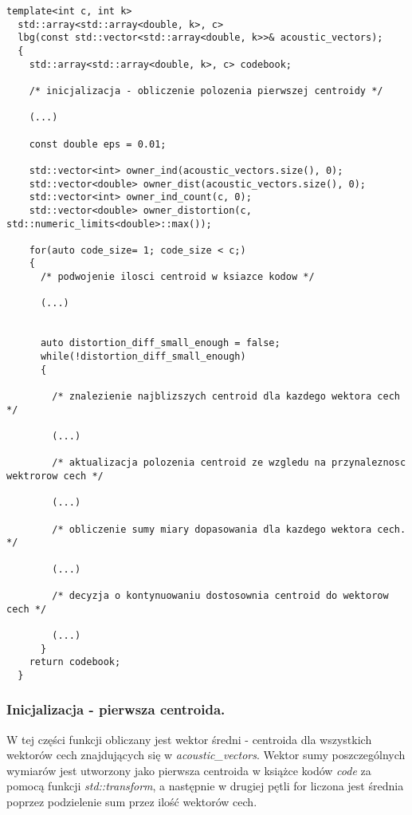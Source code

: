\begin{lstlisting}[style=lst:cpp, caption=Ciało funkcji \textit{lbg}\label{lst:lbgbody1}]
  template<int c, int k>
  std::array<std::array<double, k>, c>
  lbg(const std::vector<std::array<double, k>>& acoustic_vectors);
  {
    std::array<std::array<double, k>, c> codebook;

    /* inicjalizacja - obliczenie polozenia pierwszej centroidy */ 

    (...)

    const double eps = 0.01; 

    std::vector<int> owner_ind(acoustic_vectors.size(), 0);
    std::vector<double> owner_dist(acoustic_vectors.size(), 0);
    std::vector<int> owner_ind_count(c, 0);
    std::vector<double> owner_distortion(c, std::numeric_limits<double>::max());

    for(auto code_size= 1; code_size < c;)
    {
      /* podwojenie ilosci centroid w ksiazce kodow */

      (...)


      auto distortion_diff_small_enough = false;
      while(!distortion_diff_small_enough)
      {

        /* znalezienie najblizszych centroid dla kazdego wektora cech */

        (...)

        /* aktualizacja polozenia centroid ze wzgledu na przynaleznosc wektrorow cech */

        (...)

        /* obliczenie sumy miary dopasowania dla kazdego wektora cech. */

        (...)

        /* decyzja o kontynuowaniu dostosownia centroid do wektorow cech */

        (...)
      }
    return codebook;
  }
\end{lstlisting}

\subsubsection{Inicjalizacja - pierwsza centroida.}

W tej części funkcji obliczany jest wektor średni - centroida dla wszystkich wektorów cech znajdujących się w \textit{acoustic\_vectors}. Wektor sumy poszczególnych wymiarów jest utworzony jako pierwsza centroida w książce kodów \textit{code} za pomocą funkcji \textit{std::transform}, a następnie w drugiej pętli for liczona jest średnia poprzez podzielenie sum przez ilość wektorów cech.

